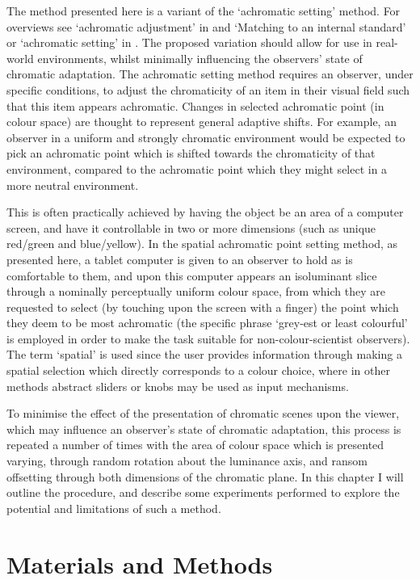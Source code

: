 The method presented here is a variant of the `achromatic setting' method. For overviews see `achromatic adjustment' in \citet{foster_color_2011} and `Matching to an internal standard' or `achromatic setting' in \citet{smithson_sensory_2005}. The proposed variation should allow for use in real-world environments, whilst minimally influencing the observers' state of chromatic adaptation. The achromatic setting method requires an observer, under specific conditions, to adjust the chromaticity of an item in their visual field such that this item appears achromatic. Changes in selected achromatic point (in colour space) are thought to represent general adaptive shifts. For example, an observer in a uniform and strongly chromatic environment would be expected to pick an achromatic point which is shifted towards the chromaticity of that environment, compared to the achromatic point which they might select in a more neutral environment. 

This is often practically achieved by having the object be an area of a computer screen, and have it controllable in two or more dimensions (such as unique red/green and blue/yellow). 
In the spatial achromatic point setting method, as presented here, a tablet computer is given to an observer to hold as is comfortable to them, and upon this computer appears an isoluminant slice through a nominally perceptually uniform colour space, from which they are requested to select (by touching upon the screen with a finger) the point which they deem to be most achromatic (the specific phrase `grey-est or least colourful' is employed in order to make the task suitable for non-colour-scientist observers). The term `spatial' is used since the user provides information through making a spatial selection which directly corresponds to a colour choice, where in other methods abstract sliders or knobs may be used as input mechanisms.

To minimise the effect of the presentation of chromatic scenes upon the viewer, which may influence an observer's state of chromatic adaptation, this process is repeated a number of times with the area of colour space which is presented varying, through random rotation about the luminance axis, and ransom offsetting through both dimensions of the chromatic plane.
In this chapter I will outline the procedure, and describe some experiments performed to explore the potential and limitations of such a method.

\section{Materials and Methods}
